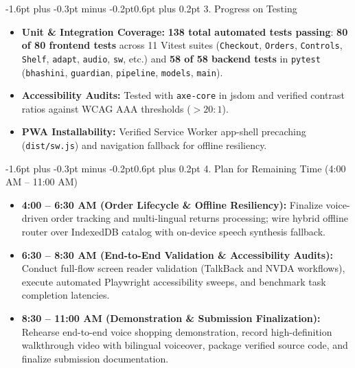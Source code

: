 \documentclass[10pt,a4paper]{article}
\makeatletter
\renewcommand{\section}{\@startsection{section}{1}{\z@}%
  {-1.6pt plus -0.3pt minus -0.2pt}{0.6pt plus 0.2pt}%
  {\normalfont\footnotesize\bfseries\scshape}}
\makeatother
\begin{document}
\section{3. Progress on Testing}
\begin{itemize}\setlength{\itemsep}{0.1pt}\setlength{\topsep}{0.1pt}\setlength{\leftmargin}{1.1em}
  \item \textbf{Unit \& Integration Coverage:} \textbf{138 total automated tests passing}: \textbf{80 of 80 frontend tests} across 11 Vitest suites (\texttt{Checkout}, \texttt{Orders}, \texttt{Controls}, \texttt{Shelf}, \texttt{adapt}, \texttt{audio}, \texttt{sw}, etc.) and \textbf{58 of 58 backend tests} in \texttt{pytest} (\texttt{bhashini}, \texttt{guardian}, \texttt{pipeline}, \texttt{models}, \texttt{main}).
  \item \textbf{Accessibility Audits:} Tested with \texttt{axe-core} in jsdom and verified contrast ratios against WCAG AAA thresholds ($> 20:1$).
  \item \textbf{PWA Installability:} Verified Service Worker app-shell precaching (\texttt{dist/sw.js}) and navigation fallback for offline resiliency.
\end{itemize}

\vspace{-2pt}
\section{4. Plan for Remaining Time (4:00 AM -- 11:00 AM)}
\begin{itemize}\setlength{\itemsep}{0.1pt}\setlength{\topsep}{0.1pt}\setlength{\leftmargin}{1.1em}
  \item \textbf{4:00 -- 6:30 AM (Order Lifecycle \& Offline Resiliency):} Finalize voice-driven order tracking and multi-lingual returns processing; wire hybrid offline router over IndexedDB catalog with on-device speech synthesis fallback.
  \item \textbf{6:30 -- 8:30 AM (End-to-End Validation \& Accessibility Audits):} Conduct full-flow screen reader validation (TalkBack and NVDA workflows), execute automated Playwright accessibility sweeps, and benchmark task completion latencies.
  \item \textbf{8:30 -- 11:00 AM (Demonstration \& Submission Finalization):} Rehearse end-to-end voice shopping demonstration, record high-definition walkthrough video with bilingual voiceover, package verified source code, and finalize submission documentation.
\end{itemize}
\end{document}

